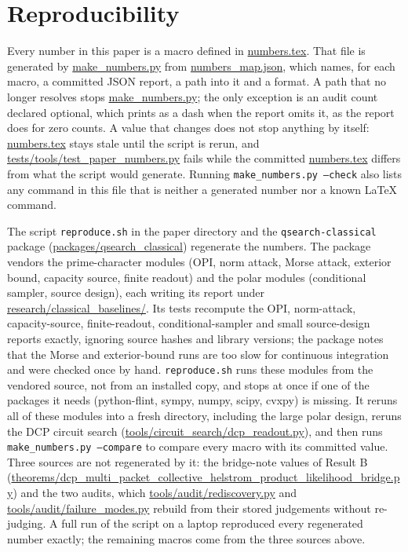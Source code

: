\documentclass[10pt]{article}
\begin{document}
\section{Reproducibility}
\label{sec:repro}

Every number in this paper is a macro defined in \url{numbers.tex}. That file is generated by \url{make_numbers.py} from \url{numbers_map.json}, which names, for each macro, a committed JSON report, a path into it and a format. A path that no longer resolves stops \url{make_numbers.py}; the only exception is an audit count declared optional, which prints as a dash when the report omits it, as the report does for zero counts. A value that changes does not stop anything by itself: \url{numbers.tex} stays stale until the script is rerun, and \url{tests/tools/test_paper_numbers.py} fails while the committed \url{numbers.tex} differs from what the script would generate. Running \texttt{make_numbers.py --check} also lists any command in this file that is neither a generated number nor a known LaTeX command.

The script \texttt{reproduce.sh} in the paper directory and the \texttt{qsearch-classical} package (\url{packages/qsearch_classical}) regenerate the numbers. The package vendors the prime-character modules (OPI, norm attack, Morse attack, exterior bound, capacity source, finite readout) and the polar modules (conditional sampler, source design), each writing its report under \url{research/classical_baselines/}. Its tests recompute the OPI, norm-attack, capacity-source, finite-readout, conditional-sampler and small source-design reports exactly, ignoring source hashes and library versions; the package notes that the Morse and exterior-bound runs are too slow for continuous integration and were checked once by hand. \texttt{reproduce.sh} runs these modules from the vendored source, not from an installed copy, and stops at once if one of the packages it needs (python-flint, sympy, numpy, scipy, cvxpy) is missing. It reruns all of these modules into a fresh directory, including the large polar design, reruns the DCP circuit search (\url{tools/circuit_search/dcp_readout.py}), and then runs \texttt{make_numbers.py --compare} to compare every macro with its committed value. Three sources are not regenerated by it: the bridge-note values of Result B (\url{theorems/dcp_multi_packet_collective_helstrom_product_likelihood_bridge.py}) and the two audits, which \url{tools/audit/rediscovery.py} and \url{tools/audit/failure_modes.py} rebuild from their stored judgements without re-judging. A full run of the script on a laptop reproduced every regenerated number exactly; the remaining macros come from the three sources above.



\end{document}
